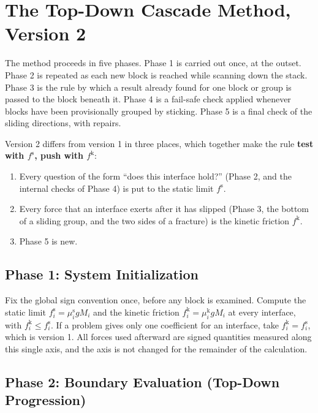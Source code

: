 \documentclass[11pt,a4paper]{article}
\newcommand{\fs}{f^{\mathrm{s}}}
\newcommand{\fkin}{f^{\mathrm{k}}}
\newcommand{\mus}{\mu^{\mathrm{s}}}
\newcommand{\muk}{\mu^{\mathrm{k}}}
\begin{document}
\section{The Top-Down Cascade Method, Version 2}\label{sec:method}

The method proceeds in five phases. Phase 1 is carried out once, at the outset. Phase 2 is repeated as each new block is reached while scanning down the stack. Phase 3 is the rule by which a result already found for one block or group is passed to the block beneath it. Phase 4 is a fail-safe check applied whenever blocks have been provisionally grouped by sticking. Phase 5 is a final check of the sliding directions, with repairs.

Version 2 differs from version 1 in three places, which together make the rule \textbf{test with $\fs$, push with $\fkin$}:
\begin{enumerate}
\item Every question of the form ``does this interface hold?'' (Phase 2, and the internal checks of Phase 4) is put to the static limit $\fs$.
\item Every force that an interface exerts after it has slipped (Phase 3, the bottom of a sliding group, and the two sides of a fracture) is the kinetic friction $\fkin$.
\item Phase 5 is new.
\end{enumerate}

\subsection{Phase 1: System Initialization}

Fix the global sign convention once, before any block is examined. Compute the static limit $\fs_i=\mus_i g M_i$ and the kinetic friction $\fkin_i=\muk_i g M_i$ at every interface, with $\fkin_i\le\fs_i$. If a problem gives only one coefficient for an interface, take $\fkin_i=\fs_i$, which is version 1. All forces used afterward are signed quantities measured along this single axis, and the axis is not changed for the remainder of the calculation.

\subsection{Phase 2: Boundary Evaluation (Top-Down Progression)}
\end{document}
